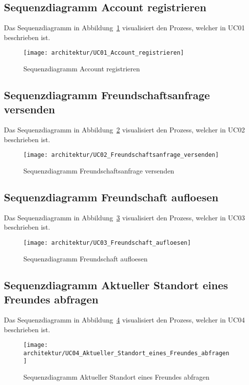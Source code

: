 \FloatBarrier
\subsection{Sequenzdiagramm Account registrieren}
Das Sequenzdiagramm in Abbildung~\ref{fig:UC01_Account_registrieren} visualisiert den Prozess, welcher in UC01 beschrieben ist.
\begin{figure}[H]
	\centering
		\texttt{[image: architektur/UC01\_Account\_registrieren]}
	\caption{Sequenzdiagramm Account registrieren}
	\label{fig:UC01_Account_registrieren}
\end{figure}

\FloatBarrier
\subsection{Sequenzdiagramm Freundschaftsanfrage versenden}
Das Sequenzdiagramm in Abbildung~\ref{fig:UC02_Freundschaftsanfrage_versenden} visualisiert den Prozess, welcher in UC02 beschrieben ist.
\begin{figure}[H]
	\centering
		\texttt{[image: architektur/UC02\_Freundschaftsanfrage\_versenden]}
	\caption{Sequenzdiagramm Freundschaftsanfrage versenden}
	\label{fig:UC02_Freundschaftsanfrage_versenden}
\end{figure}

\FloatBarrier
\subsection{Sequenzdiagramm Freundschaft aufloesen}
Das Sequenzdiagramm in Abbildung~\ref{fig:UC03_Freundschaft_aufloesen} visualisiert den Prozess, welcher in UC03 beschrieben ist.
\begin{figure}[H]
	\centering
		\texttt{[image: architektur/UC03\_Freundschaft\_aufloesen]}
	\caption{Sequenzdiagramm Freundschaft aufloesen}
	\label{fig:UC03_Freundschaft_aufloesen}
\end{figure}

\FloatBarrier
\subsection{Sequenzdiagramm Aktueller Standort eines Freundes abfragen}
Das Sequenzdiagramm in Abbildung~\ref{fig:UC04_Aktueller_Standort_eines_Freundes_abfragen} visualisiert den Prozess, welcher in UC04 beschrieben ist.
\begin{figure}[H]
	\centering
		\texttt{[image: architektur/UC04\_Aktueller\_Standort\_eines\_Freundes\_abfragen]}
	\caption{Sequenzdiagramm Aktueller Standort eines Freundes abfragen}
	\label{fig:UC04_Aktueller_Standort_eines_Freundes_abfragen}
\end{figure}

